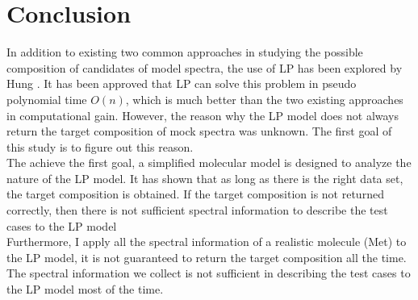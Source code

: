   \label{ch:7}

\section{Conclusion}
In addition to existing two common approaches in studying the possible composition of candidates of model spectra, the use of LP has been explored by Hung \cite{KuoKaiHung:Thesis:2015}. It has been approved that LP can solve this problem in  pseudo polynomial time $O(n)$, which is much better than the two existing approaches in computational gain. However, the reason why the LP model does not always return the target composition of mock spectra was unknown. The first goal of this study is to figure out this reason. \\

The achieve the first goal, a simplified molecular model is designed to analyze the nature of the LP model. It has shown that as long as there is the right data set, the target composition is obtained. If the target composition is not returned correctly, then there is not sufficient spectral information to describe the test cases to the LP model \\

Furthermore, I apply all the spectral information of a realistic molecule (Met) to the LP model, it is not guaranteed to return the target composition all the time. The spectral information we collect is not sufficient in describing the test cases to the LP model most of the time. \\




